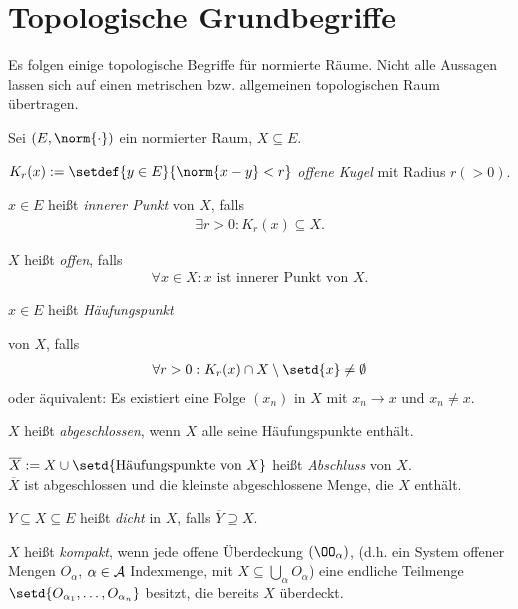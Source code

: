 \section{Topologische Grundbegriffe}

Es folgen einige topologische Begriffe für normierte Räume. Nicht alle Aussagen
lassen sich auf einen metrischen bzw. allgemeinen topologischen Raum übertragen.

\begin{defn}
\label{defn:1.12}
Sei $(E,\norm{\cdot})$ ein normierter Raum, $X\subseteq E$.
\begin{defnenum}
  \item $K_r(x) := \setdef{y\in E}{\norm{x-y} < r}$
  \emph{offene Kugel} mit Radius $r (>0)$.
  \item $x\in E$ heißt \emph{innerer Punkt} von $X$,
  falls
\begin{align*}
\exists r > 0 : K_r(x) \subseteq X.
\end{align*}
\item $X$ heißt \emph{offen}, falls
\begin{align*}
\forall x\in X : x\text{ ist innerer Punkt von $X$}.
\end{align*}
\item $x\in E$ heißt \emph{Häufungspunkt}\item  von $X$, falls
\begin{align*}
\forall r>0 : K_r(x)\cap X\setminus \setd{x} \neq \emptyset
\end{align*}
oder äquivalent: Es existiert eine Folge $(x_n)$ in $X$ mit $x_n\to x$ und
$x_n\neq x$.
\item $X$ heißt \emph{abgeschlossen}, wenn $X$ alle
seine Häufungspunkte enthält.
\item $\overline{X}:=X\cup\setd{\text{Häufungspunkte von }X}$ heißt
\emph{Abschluss} von $X$. \\
$\overline{X}$ ist abgeschlossen und die kleinste abgeschlossene Menge, die $X$
enthält.
\item $Y\subseteq X\subseteq E$ heißt \emph{dicht} in $X$,
falls $\overline{Y}\supseteq X$.
\item $X$ heißt \emph{kompakt}, wenn jede offene
Überdeckung $(\OO_\alpha)$, (d.h. ein System offener Mengen $O_\alpha$, $\alpha\in\AA$ Indexmenge, mit
 $X\subseteq \bigcup_\alpha O_\alpha$) eine endliche Teilmenge 
 $\setd{O_{\alpha_1},\ldots,O_{\alpha_n}}$ besitzt, die bereits $X$ überdeckt.\\

\end{defnenum}
\end{defn}
